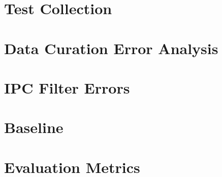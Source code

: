 \section{Test Collection}
\section{Data Curation Error Analysis}
\section{IPC Filter Errors}
\section{Baseline}
\section{Evaluation Metrics}


